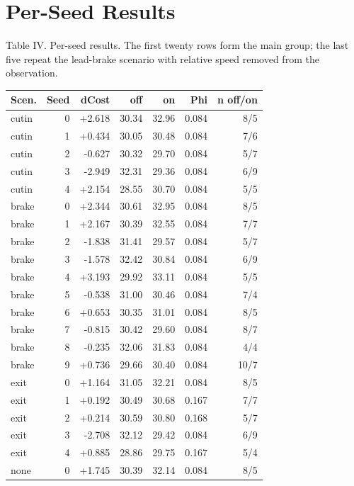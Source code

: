 \documentclass[journal]{IEEEtran}
\begin{document}
\appendix\section{Per-Seed Results}
\begin{center}\footnotesize
Table IV. Per-seed results. The first twenty rows form the main group; the last five
repeat the lead-brake scenario with relative speed removed from the observation.\\[2pt]
\begin{center}
\centering
\small
\begin{tabular}{lrrrrrr}
\hline
Scen. & Seed & dCost & off & on & Phi & n off/on \\
\hline
cutin & 0 & +2.618 & 30.34 & 32.96 & 0.084 & 8/5 \\
cutin & 1 & +0.434 & 30.05 & 30.48 & 0.084 & 7/6 \\
cutin & 2 & -0.627 & 30.32 & 29.70 & 0.084 & 5/7 \\
cutin & 3 & -2.949 & 32.31 & 29.36 & 0.084 & 6/9 \\
cutin & 4 & +2.154 & 28.55 & 30.70 & 0.084 & 5/5 \\
brake & 0 & +2.344 & 30.61 & 32.95 & 0.084 & 8/5 \\
brake & 1 & +2.167 & 30.39 & 32.55 & 0.084 & 7/7 \\
brake & 2 & -1.838 & 31.41 & 29.57 & 0.084 & 5/7 \\
brake & 3 & -1.578 & 32.42 & 30.84 & 0.084 & 6/9 \\
brake & 4 & +3.193 & 29.92 & 33.11 & 0.084 & 5/5 \\
brake & 5 & -0.538 & 31.00 & 30.46 & 0.084 & 7/4 \\
brake & 6 & +0.653 & 30.35 & 31.01 & 0.084 & 8/5 \\
brake & 7 & -0.815 & 30.42 & 29.60 & 0.084 & 8/7 \\
brake & 8 & -0.235 & 32.06 & 31.83 & 0.084 & 4/4 \\
brake & 9 & +0.736 & 29.66 & 30.40 & 0.084 & 10/7 \\
exit & 0 & +1.164 & 31.05 & 32.21 & 0.084 & 8/5 \\
exit & 1 & +0.192 & 30.49 & 30.68 & 0.167 & 7/7 \\
exit & 2 & +0.214 & 30.59 & 30.80 & 0.168 & 5/7 \\
exit & 3 & -2.708 & 32.12 & 29.42 & 0.084 & 6/9 \\
exit & 4 & +0.885 & 28.86 & 29.75 & 0.167 & 5/4 \\
none & 0 & +1.745 & 30.39 & 32.14 & 0.084 & 8/5 \\

\end{tabular}
\end{center}
\end{center}
\end{document}

